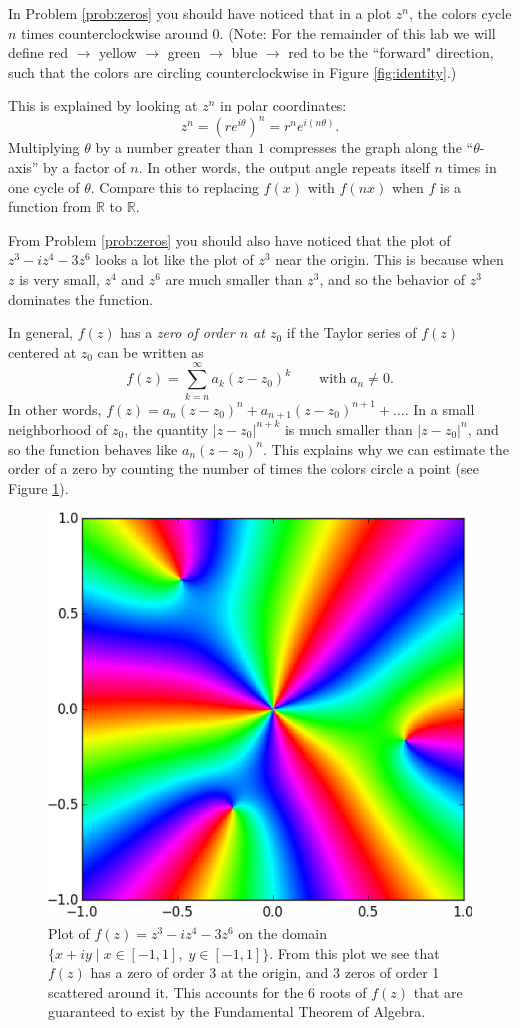 In Problem \ref{prob:zeros} you should have noticed that in a plot $z^n$, the colors cycle $n$ times counterclockwise around 0.
(Note: For the remainder of this lab we will define red $\rightarrow$ yellow $\rightarrow$ green $\rightarrow$ blue $\rightarrow$ red to be the ``forward" direction, such that the colors are circling counterclockwise in Figure \ref{fig:identity}.)

This is explained by looking at $z^n$ in polar coordinates:
\[
z^n = (re^{i \theta})^n = r^n e^{i(n\theta)}.
\]
Multiplying $\theta$ by a number greater than $1$ compresses the graph along the ``$\theta$-axis'' by a factor of $n$.
In other words, the output angle repeats itself $n$ times in one cycle of $\theta$.
Compare this to replacing $f(x)$ with $f(nx)$ when $f$ is a function from $\mathbb{R}$ to $\mathbb{R}$.

From Problem \ref{prob:zeros} you should also have noticed that the plot of $z^3 - iz^4 - 3z^6$ looks a lot like the plot of $z^3$ near the origin.
This is because when $z$ is very small, $z^4$ and $z^6$ are much smaller than $z^3$, and so the behavior of $z^3$ dominates the function.

In general, $f(z)$ has a \emph{zero of order $n$ at $z_0$} if the Taylor series of $f(z)$ centered at $z_0$ can be written as
\[
f(z) = \sum_{k=n}^{\infty} a_k(z-z_0)^k \qquad \text{with} \; a_n \neq 0.
\]
In other words, $f(z) = a_n(z-z_0)^n + a_{n+1}(z-z_0)^{n+1} + \ldots$.
In a small neighborhood of $z_0$, the quantity $|z-z_0|^{n+k}$ is much smaller than $|z-z_0|^n$, and so the function behaves like $a_n(z-z_0)^n$.
This explains why we can estimate the order of a zero by counting the number of times the colors circle a point (see Figure \ref{fig:zeros}).

\begin{figure}
\includegraphics[width=.6\textwidth]{figures/zeros.pdf}
\caption{Plot of $f(z)=z^3 - iz^4 - 3z^6$ on the domain $\{x+iy \mid x \in [-1,1] , \; y \in [-1,1]\}$.
From this plot we see that $f(z)$ has a zero of order 3 at the origin, and 3 zeros of order 1 scattered around it.
This accounts for the 6 roots of $f(z)$ that are guaranteed to exist by the Fundamental Theorem of Algebra.}
\label{fig:zeros}
\end{figure}


